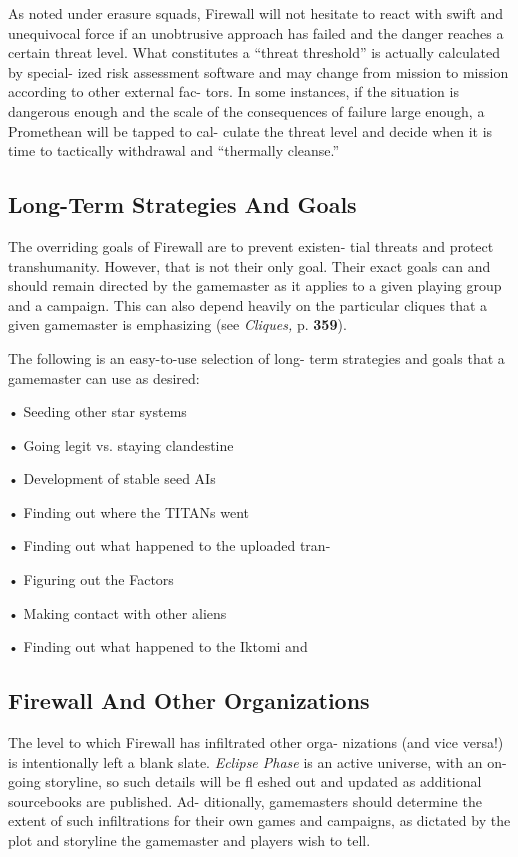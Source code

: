 As noted under erasure squads, Firewall will not 
hesitate to react with swift and unequivocal force if 
an unobtrusive approach has failed and the danger 
reaches a certain threat level. What constitutes a 
``threat threshold'' is actually calculated by special-
ized risk assessment software and may change from 
mission to mission according to other external fac-
tors. In some instances, if the situation is dangerous 
enough and the scale of the consequences of failure 
large enough, a Promethean will be tapped to cal-
culate the threat level and decide when it is time to 
tactically withdrawal and ``thermally cleanse.'' 

\subsection{Long-Term Strategies And Goals }

The overriding goals of Firewall are to prevent existen-
tial threats and protect transhumanity. However, that 
is not their only goal. Their exact goals can and should 
remain directed by the gamemaster as it applies to a 
given playing group and a campaign. This can also 
depend heavily on the particular cliques that a given 
gamemaster is emphasizing (see \textit{Cliques,} p. \textbf{359}). 

The following is an easy-to-use selection of long-
term strategies and goals that a gamemaster can use 
as desired: 

•  Seeding other star systems 

•  Going legit vs. staying clandestine 

•  Development of stable seed AIs 

•  Finding out where the TITANs went 

•  Finding out what happened to the uploaded tran-

•  Figuring out the Factors 

•  Making contact with other aliens 

•  Finding out what happened to the Iktomi and 

\subsection{Firewall And Other Organizations }

The level to which Firewall has infiltrated other orga-
nizations (and vice versa!) is intentionally left a blank 
slate. \textit{Eclipse Phase }is an active universe, with an on-
going storyline, so such details will be fl eshed out and 
updated as additional sourcebooks are published. Ad-
ditionally, gamemasters should determine the extent of 
such infiltrations for their own games and campaigns, 
as dictated by the plot and storyline the gamemaster 
and players wish to tell. 

